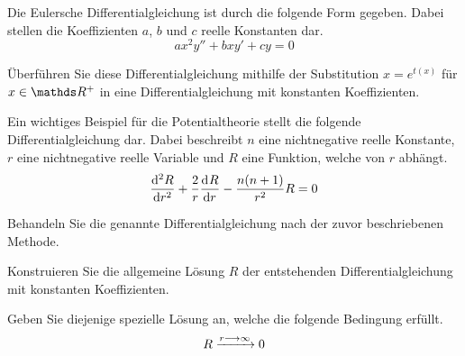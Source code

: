 \begin{atiTask}[
	title = Die homogene Euler-Gleichung,
	topic = Gewöhnliche Differentialgleichungen,
	subtopic = Die lineare homogene Differentialgleichung 2. Ordnung mit konstanten Koeffizienten,
	language = Deutsch,
]
	Die Eulersche Differentialgleichung ist durch die folgende Form gegeben.
	Dabei stellen die Koeffizienten $a$, $b$ und $c$ reelle Konstanten dar.
	\[
		ax^2y'' + bxy' + cy = 0
	\]
	\begin{atiSubtasks}
		\item{
			Überführen Sie diese Differentialgleichung mithilfe der Substitution $x = e^{t(x)}$ für $x\in\setR^+$ in eine Differentialgleichung mit konstanten Koeffizienten.
		}
		\item{
			Ein wichtiges Beispiel für die Potentialtheorie stellt die folgende Differentialgleichung dar.
			Dabei beschreibt $n$ eine nichtnegative reelle Konstante, $r$ eine nichtnegative reelle Variable und $R$ eine Funktion, welche von $r$ abhängt.
			\[
				\nfdrv[2]{R}{r} + \frac{2}{r}\nfdrv{R}{r} - \frac{n(n+1)}{r^2}R = 0
			\]
			\begin{atiSubsubtasks}
				\item{
					Behandeln Sie die genannte Differentialgleichung nach der zuvor beschriebenen Methode.
				}
				\item{
					Konstruieren Sie die allgemeine Lösung $R$ der entstehenden Differentialgleichung mit konstanten Koeffizienten.
				}
				\item{
					Geben Sie diejenige spezielle Lösung an, welche die folgende Bedingung erfüllt.
					\[
						R\conv[r\conv\infty]0
					\]
				}
			\end{atiSubsubtasks}
		}
	\end{atiSubtasks}
\end{atiTask}